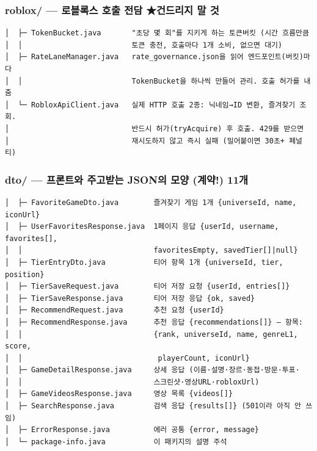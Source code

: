\documentclass[11pt]{article}
\begin{document}
\subsubsection*{roblox/ --- 로블록스 호출 전담 ★건드리지 말 것}
\begin{Verbatim}[frame=single, fontsize=\small]
│  ├─ TokenBucket.java       "초당 몇 회"를 지키게 하는 토큰버킷 (시간 흐름만큼
│  │                         토큰 충전, 호출마다 1개 소비, 없으면 대기)
│  ├─ RateLaneManager.java   rate_governance.json을 읽어 엔드포인트(버킷)마다
│  │                         TokenBucket을 하나씩 만들어 관리. 호출 허가를 내줌
│  └─ RobloxApiClient.java   실제 HTTP 호출 2종: 닉네임→ID 변환, 즐겨찾기 조회.
│                            반드시 허가(tryAcquire) 후 호출. 429를 받으면
│                            재시도하지 않고 즉시 실패 (밀어붙이면 30초+ 페널티)
\end{Verbatim}

\subsubsection*{dto/ --- 프론트와 주고받는 JSON의 모양 (계약!) 11개}
\begin{Verbatim}[frame=single, fontsize=\small]
│  ├─ FavoriteGameDto.java        즐겨찾기 게임 1개 {universeId, name, iconUrl}
│  ├─ UserFavoritesResponse.java  1페이지 응답 {userId, username, favorites[],
│  │                              favoritesEmpty, savedTier[]|null}
│  ├─ TierEntryDto.java           티어 항목 1개 {universeId, tier, position}
│  ├─ TierSaveRequest.java        티어 저장 요청 {userId, entries[]}
│  ├─ TierSaveResponse.java       티어 저장 응답 {ok, saved}
│  ├─ RecommendRequest.java       추천 요청 {userId}
│  ├─ RecommendResponse.java      추천 응답 {recommendations[]} — 항목:
│  │                              {rank, universeId, name, genreL1, score,
│  │                               playerCount, iconUrl}
│  ├─ GameDetailResponse.java     상세 응답 (이름·설명·장르·동접·방문·투표·
│  │                              스크린샷·영상URL·robloxUrl)
│  ├─ GameVideosResponse.java     영상 목록 {videos[]}
│  ├─ SearchResponse.java         검색 응답 {results[]} (501이라 아직 안 쓰임)
│  ├─ ErrorResponse.java          에러 공통 {error, message}
│  └─ package-info.java           이 패키지의 설명 주석
\end{Verbatim}
\end{document}

